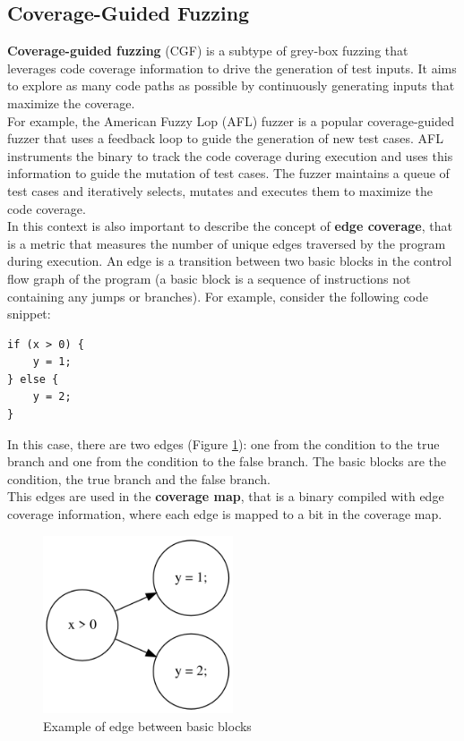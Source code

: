 \subsection{Coverage-Guided Fuzzing}
\textbf{Coverage-guided fuzzing} (CGF) is a subtype of grey-box fuzzing that leverages code coverage information to drive the generation of test inputs. It aims to explore as many code paths as possible by continuously generating inputs that maximize the coverage.
\\For example, the American Fuzzy Lop (AFL) fuzzer is a popular coverage-guided fuzzer that uses a feedback loop to guide the generation of new test cases. AFL instruments the binary to track the code coverage during execution and uses this information to guide the mutation of test cases. The fuzzer maintains a queue of test cases and iteratively selects, mutates and executes them to maximize the code coverage.
\\In this context is also important to describe the concept of \textbf{edge coverage}, that is a metric that measures the number of unique edges traversed by the program during execution. An edge is a transition between two basic blocks in the control flow graph of the program (a basic block is a sequence of instructions not containing any jumps or branches).
For example, consider the following code snippet:
\begin{lstlisting}
if (x > 0) {
    y = 1;
} else {
    y = 2;
}
\end{lstlisting}
In this case, there are two edges (Figure \ref{fig:sample_edge_graph}): one from the condition to the true branch and one from the condition to the false branch. The basic blocks are the condition, the true branch and the false branch.
\\This edges are used in the \textbf{coverage map}, that is a binary compiled with edge coverage information, where each edge is mapped to a bit in the coverage map.
\begin{figure}[H]
    \centering
    \includegraphics[width=0.5\textwidth]{Images/sample_edge_graph.png}
    \caption{Example of edge between basic blocks}
    \label{fig:sample_edge_graph}
\end{figure}
